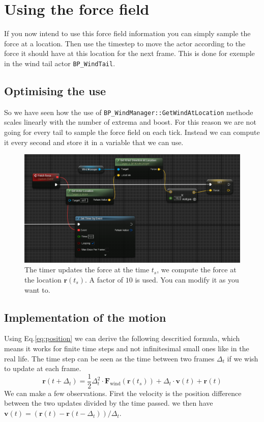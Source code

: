 \documentclass[../main.tex]{subfile}
\begin{document}
\section{Using the force field}
    If you now intend to use this force field information you can simply sample the force at a location. Then use the timestep to 
    move the actor according to the force it should have at this location for the next frame. This is done for exemple
    in the wind tail actor \texttt{BP\_WindTail}.

    \subsection{Optimising the use}
    So we have seen how the use of \texttt{BP\_WindManager::GetWindAtLocation} methode scales linearly with the number of extrema and boost.
    For this reason we are not going for every tail to sample the force field on each tick.
    Instead we can compute it every second and store it in a variable
    that we can use.

    \begin{figure}[H]
        \centering
        \includegraphics[width=.7\textwidth]{Ressources/TailUpdateForce.png}
        \caption{The timer updates the force at the time $t_s$, we compute the force at the location $\bm{r}(t_s)$. A factor of $10$ is used. You can modify it as you want to.}
    \end{figure}
    
    \subsection{Implementation of the motion}
    Using Eq.\ref{eq:position} we can derive the following descritied formula, which means it works for finite time steps and not infinitesimal 
    small ones like in the real life. The time step can be seen as the time between two frames $\Delta_t$ if we wish to update at each frame.
    \begin{equation}
        \bm{r}(t+\Delta_t) = \frac{1}{2} \Delta_t^2 \cdot \bm{F}_{\text{wind}}(\bm{r}(t_s)) + \Delta_t \cdot \bm{v}(t)+  \bm{r}(t)
    \end{equation}
    We can make a few observations. First the velocity is the position difference between the two updates divided by the time passed.
    we then have $\bm{v}(t) = \left(\bm{r}(t) - \bm{r}(t-\Delta_t)\right) / \Delta_t$.\\
\end{document}
